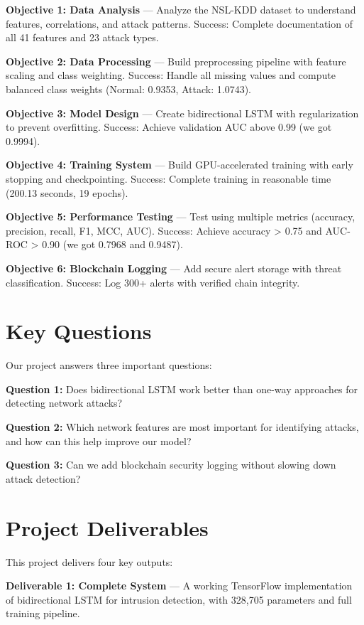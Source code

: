 \documentclass[12pt,a4paper]{report}
\begin{document}
\textbf{Objective 1: Data Analysis} --- Analyze the NSL-KDD dataset to understand features, correlations, and attack patterns. Success: Complete documentation of all 41 features and 23 attack types.

\textbf{Objective 2: Data Processing} --- Build preprocessing pipeline with feature scaling and class weighting. Success: Handle all missing values and compute balanced class weights (Normal: 0.9353, Attack: 1.0743).

\textbf{Objective 3: Model Design} --- Create bidirectional LSTM with regularization to prevent overfitting. Success: Achieve validation AUC above 0.99 (we got 0.9994).

\textbf{Objective 4: Training System} --- Build GPU-accelerated training with early stopping and checkpointing. Success: Complete training in reasonable time (200.13 seconds, 19 epochs).

\textbf{Objective 5: Performance Testing} --- Test using multiple metrics (accuracy, precision, recall, F1, MCC, AUC). Success: Achieve accuracy > 0.75 and AUC-ROC > 0.90 (we got 0.7968 and 0.9487).

\textbf{Objective 6: Blockchain Logging} --- Add secure alert storage with threat classification. Success: Log 300+ alerts with verified chain integrity.

\section{Key Questions}

Our project answers three important questions:

\textbf{Question 1:} Does bidirectional LSTM work better than one-way approaches for detecting network attacks?

\textbf{Question 2:} Which network features are most important for identifying attacks, and how can this help improve our model?

\textbf{Question 3:} Can we add blockchain security logging without slowing down attack detection?

\section{Project Deliverables}

This project delivers four key outputs:

\textbf{Deliverable 1: Complete System} --- A working TensorFlow implementation of bidirectional LSTM for intrusion detection, with 328,705 parameters and full training pipeline.
\end{document}
